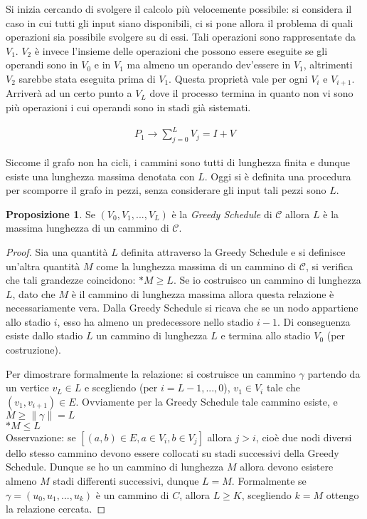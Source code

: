 \documentclass[a4paper,portrait,12pt]{article}
\theoremstyle{definition}
\newtheorem{proposition}{Proposizione}
\begin{document}
Si inizia cercando di svolgere il calcolo più velocemente possibile: si considera il caso in cui tutti gli input siano disponibili, ci si pone allora il problema di quali operazioni sia possibile svolgere su di essi.
Tali operazioni sono rappresentate da $V_1$. $V_2$ è invece l’insieme delle operazioni che possono essere eseguite se gli operandi sono in $V_0$ e in $V_1$ ma almeno un operando dev’essere in $V_1$, altrimenti $V_2$ sarebbe stata eseguita prima di $V_1$.
Questa proprietà vale per ogni $V_i$ e $V_{i+1}$. 
Arriverà ad un certo punto a $V_L$ dove il processo termina in quanto non vi sono più operazioni i cui operandi sono in stadi già sistemati.

\begin{align*}
P_1 \to \sum_{j=0}^L V_j = I + V
\end{align*}

Siccome il grafo non ha cicli, i cammini sono tutti di lunghezza finita e dunque esiste una lunghezza massima denotata con $L$.
Oggi si è definita una procedura per scomporre il grafo in pezzi, senza considerare gli input tali pezzi sono $L$.

\begin{proposition}
Se $(V_0,V_1,...,V_L)$ è la \textit{Greedy Schedule} di $\mathcal{C}$ allora $L$ è la massima lunghezza di un cammino di $\mathcal{C}$.
\end{proposition}
\begin{proof}
Sia una quantità $L$ definita attraverso la Greedy Schedule e si definisce un’altra quantità $M$ come la lunghezza massima di un cammino di $\mathcal{C}$, si verifica che tali grandezze coincidono: $* M \ge L$.
Se io costruisco un cammino di lunghezza $L$, dato che $M$ è il cammino di lunghezza massima allora questa relazione è necessariamente vera.
Dalla Greedy Schedule si ricava che se un nodo appartiene allo stadio $i$, esso ha almeno un predecessore nello stadio $i-1$.
Di conseguenza esiste dallo stadio $L$ un cammino di lunghezza $L$ e termina allo stadio $V_0$ (per costruzione).

Per dimostrare formalmente la relazione: si costruisce un cammino $\gamma$ partendo da un vertice $v_L \in L$ e scegliendo (per $i = L-1,...,0$), $v_1 \in V_i$ tale che $(v_1, v_{i+1}) \in E$.
Ovviamente per la Greedy Schedule tale cammino esiste, e $M \ge \| \gamma \| = L$\\
$* M \le L$\\
Osservazione: se $[(a,b) \in E,a \in V_i, b \in V_j]$ allora $j > i$, cioè due nodi diversi dello stesso cammino devono essere collocati su stadi successivi della Greedy Schedule.
Dunque se ho un cammino di lunghezza $M$ allora devono esistere almeno $M$ stadi differenti successivi, dunque $L = M$.
Formalmente se $\gamma = (u_0, u_1,...,u_k)$ è un cammino di $C$, allora $L \ge K$, scegliendo $k = M$ ottengo la relazione cercata.
\end{proof}
\end{document}
